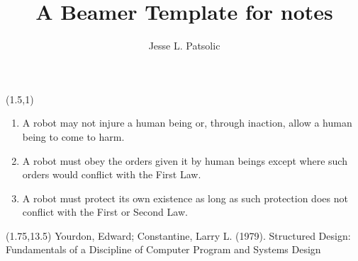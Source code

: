 \documentclass[xcolor=dvipsnames, aspectratio=169]{beamer}
\title[Daily Notes]{A Beamer Template for notes}
\subtitle[]{}
\author[JLP]{Jesse L. Patsolic}
\def\Title#1{\noindent{\large\textcolor{white}{\sf{#1}}}}
\begin{document}
\begin{frame}[plain]

\begin{textblock}{14}(1.5,1)
	\small{\rm{
\begin{enumerate}
	\item A robot may not injure a human being or, through inaction, allow a human being to come to harm.
	\item A robot must obey the orders given it by human beings except where such orders would conflict with the First Law.
	\item A robot must protect its own existence as long as such protection does not conflict with the First or Second Law.
\end{enumerate}
}}
\end{textblock}

\begin{textblock}{14}(1.75,13.5)
Yourdon, Edward; Constantine, Larry L. (1979). Structured Design: Fundamentals of a Discipline of Computer Program and Systems Design
\end{textblock}

\end{frame}
\end{document}
